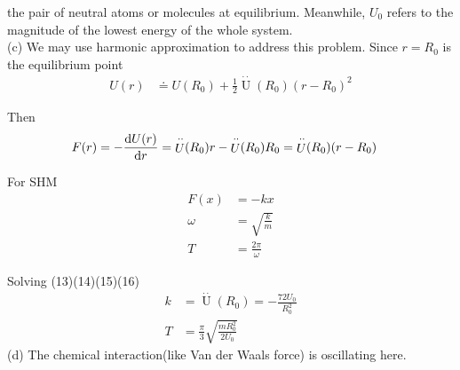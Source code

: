 \documentclass[12pt,a4paper]{article}
\begin{document}
the pair of neutral atoms or molecules at equilibrium. Meanwhile, $U_0$ refers to the magnitude
of the lowest energy of the whole system.\\
\noindent (c) We may use harmonic approximation to address this problem. Since $r=R_0$ is the equilibrium
point
\begin{align}
    U(r) &\doteq U(R_0) + \frac{1}{2}\mathop{U}\limits^{\cdot\cdot} (R_0) (r-R_0)^2
\end{align}
\par Then
\begin{align}
    F(r) &= -\frac{{\rm d}U(r)}{{\rm d}r} = \mathop{U}\limits^{\cdot\cdot}(R_0) r -
    \mathop{U}\limits^{\cdot\cdot}(R_0) R_0 = \mathop{U}\limits^{\cdot\cdot}(R_0) (r - R_0)
\end{align}
\par For SHM
\begin{align}
    F(x) &= -kx\\
    \omega &= \sqrt{\frac{k}{m}}\\
    T &= \frac{2\pi}{\omega}
\end{align}
\par Solving (13)(14)(15)(16)
\begin{align}
    k &= \mathop{U}\limits^{\cdot\cdot}(R_0) = -\frac{72U_0}{R_0^2}\\
    T &= \frac{\pi}{3} \sqrt{\frac{mR_0^2}{2U_0}}
\end{align}
\noindent (d) The chemical interaction(like Van der Waals force) is oscillating here.
\end{document}
